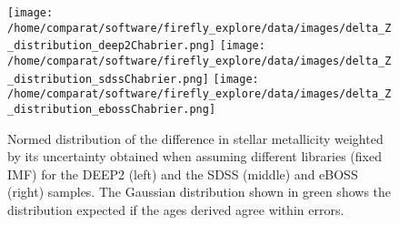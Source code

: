 \documentclass[onecolumn]{aa}
\begin{document}
\begin{figure}
\begin{center}
\caption{\label{fig:distributions:MwZ} 
Normed distribution of the difference in stellar metallicity weighted by its uncertainty obtained when assuming different libraries (fixed IMF) for the DEEP2 (left) and the SDSS (middle) and eBOSS (right) samples. The Gaussian distribution shown in green shows the distribution expected if the ages derived agree within errors.}  
\texttt{[image: /home/comparat/software/firefly\_explore/data/images/delta\_Z\_distribution\_deep2Chabrier.png]}
\hspace*{-0.5cm}
\texttt{[image: /home/comparat/software/firefly\_explore/data/images/delta\_Z\_distribution\_sdssChabrier.png]}
\hspace*{-0.5cm}
\texttt{[image: /home/comparat/software/firefly\_explore/data/images/delta\_Z\_distribution\_ebossChabrier.png]}
\end{center}
\end{figure}

% 
\end{document}
